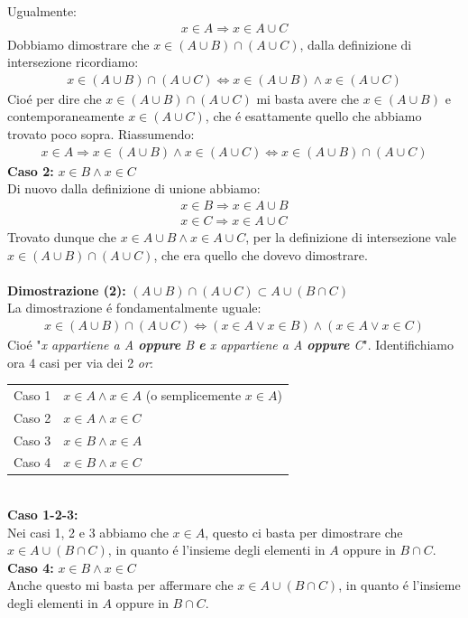 \documentclass[twoside]{article} %
\begin{document}
	Ugualmente:
	\begin{gather*}
		x\in A\Rightarrow x\in A\cup C
	\end{gather*}	
	Dobbiamo dimostrare che $x\in (A\cup B)\cap (A\cup C)$, dalla definizione di intersezione ricordiamo:
	\begin{gather*}
		x\in (A\cup B)\cap (A\cup C)\Leftrightarrow x\in (A\cup B) \wedge x\in (A\cup C)
	\end{gather*}
	Cio\'e per dire che $x\in (A\cup B)\cap (A\cup C)$ mi basta avere che $x\in (A\cup B)$ e contemporaneamente $x\in (A\cup C)$, che \'e esattamente quello che abbiamo trovato poco sopra. Riassumendo:
	\begin{gather*}
		x\in A\Rightarrow x\in (A\cup B)\wedge x\in (A\cup C)\Leftrightarrow x\in (A\cup B)\cap (A\cup C)
	\end{gather*}
	\newpage
	\noindent \textbf{Caso 2:} $x\in B \wedge x\in C$\\
	Di nuovo dalla definizione di unione abbiamo:
	\begin{gather*}
		x\in B\Rightarrow x\in A\cup B\\
		x\in C\Rightarrow x\in A\cup C		
	\end{gather*}
	Trovato dunque che $x\in A\cup B\wedge x\in A\cup C$, per la definizione di intersezione vale $x\in (A\cup B)\cap (A\cup C)$, che era quello che dovevo dimostrare.\\ \\
	\textbf{Dimostrazione (2): }$(A\cup B)\cap (A\cup C)\subset A\cup (B\cap C)$\\
	 La dimostrazione \'e fondamentalmente uguale:
	 \begin{gather*}
	 	x\in (A\cup B)\cap (A\cup C)\Leftrightarrow (x\in A \vee x\in B)\wedge (x\in A \vee x\in C)
	 \end{gather*}
	 Cio\'e "\textit{x appartiene a \textit{A} \textbf{oppure} \textit{B} \textbf{e} \textit{x} appartiene a \textit{A} \textbf{oppure} \textit{C}}". Identifichiamo ora 4 casi{\vspace{5pt}} per via dei 2 \textit{or}:\\
	\vspace{5pt}	
	\begin{tabular}{cl} 							
		Caso 1 & $x\in A \wedge x\in A$ (o semplicemente $x\in A$)\\
		Caso 2 & $x\in A \wedge x\in C$\\
		Caso 3 & $x\in B \wedge x\in A$\\
		Caso 4 & $x\in B \wedge x\in C$
	\end{tabular}\\
	\textbf{Caso 1-2-3:} \\
	Nei casi 1, 2 e 3 abbiamo che $x\in A$, questo ci basta per dimostrare che $x\in A\cup (B\cap C)$, in quanto \'e l'insieme degli elementi in $A$ oppure in $B\cap C${\vspace{5pt}}.\\ 
	\textbf{Caso 4:} $x\in B\wedge x\in C$\\
	Anche questo mi basta per affermare che $x\in A\cup (B\cap C)$, in quanto \'e l'insieme degli elementi in $A$ oppure in $B\cap C${\vspace{5pt}}.\\ 
	\newpage
	
\end{document}
